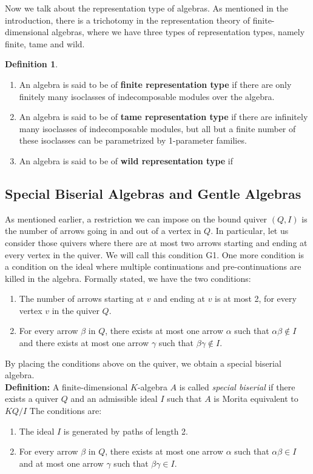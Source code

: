 \documentclass{report}
\theoremstyle{definition}
\newtheorem{definition}{Definition}
\numberwithin{figure}{section}
\begin{document}
Now we talk about the representation type of algebras. As mentioned in the introduction, there is a trichotomy in the representation theory of finite-dimensional algebras, where we have three types of representation types, namely finite, tame and wild.

\begin{definition}
    \begin{enumerate}
        \item An algebra is said to be of \textbf{finite representation type} if there are only finitely many isoclasses of indecomposable modules over the algebra.
        \item An algebra is said to be of \textbf{tame representation type} if there are infinitely many isoclasses of indecomposable modules, but all but a finite number of these isoclasses can be parametrized by 1-parameter families.
        \item An algebra is said to be of \textbf{wild representation type} if
    \end{enumerate}
\end{definition}
\subsection{Special Biserial Algebras and Gentle Algebras}

As mentioned earlier, a restriction we can impose on the bound quiver $(Q,I)$ is the number of arrows going in and out of a vertex in $Q$. In particular, let us consider those quivers where there are at most two arrows starting and ending at every vertex in the quiver. We will call this condition G1. One more condition is a condition on the ideal where multiple continuations and pre-continuations are killed in the algebra. Formally stated, we have the two conditions:
\begin{enumerate}
    \item[G1)] The number of arrows starting at $v$ and ending at $v$ is at most 2, for every vertex $v$ in the quiver $Q$.
    \item[G2)] For every arrow $\beta$ in $Q$, there exists at most one arrow $\alpha$ such that $\alpha\beta\notin I$ and there exists at most one arrow $\gamma$ such that $\beta\gamma \notin I$.
\end{enumerate}

By placing the conditions above on the quiver, we obtain a special biserial algebra.\\

\textbf{Definition: } A finite-dimensional $K$-algebra $A$ is called \textit{special biserial} if there exists a quiver $Q$ and an admissible ideal $I$ such that $A$ is Morita equivalent to $KQ/I$ 
The conditions are:
\begin{enumerate}
    
    \item[G3)] The ideal $I$ is generated by paths of length 2.
    \item[G4)] For every arrow $\beta$ in $Q$, there exists at most one arrow $\alpha$ such that $\alpha\beta\in I$ and at most one arrow $\gamma$ such that $\beta\gamma \in I$.       
\end{enumerate}
 
\end{document}
